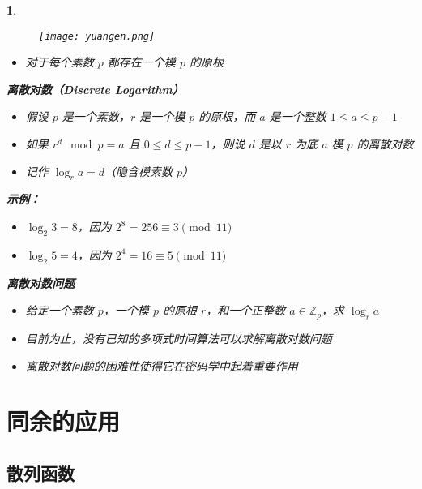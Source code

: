 \documentclass[UTF8]{report}
\theoremstyle{MyLineTheoremStyle} %
\theoremstyle{MyBlockTheoremStyle} %
\theoremstyle{MySubsubsectionStyle} %
\newtheorem{definition}{}
\begin{document}
\begin{definition}
    \begin{figure}[ht]
        \centering
        \texttt{[image: yuangen.png]}
    \end{figure}

    \begin{itemize}
        \item 对于每个素数 $p$ 都存在一个模 $p$ 的原根
    \end{itemize}

    \textbf{离散对数（Discrete Logarithm）}
    \begin{itemize}
        \item 假设 $p$ 是一个素数，$r$ 是一个模 $p$ 的原根，而 $a$ 是一个整数 $1 \leq a \leq p - 1$
        \item 如果 $r^d \mod{p} = a $ 且 $0 \leq d \leq p - 1$，则说 $d$ 是以 $r$ 为底 $a$ 模 $p$ 的离散对数
        \item 记作 $\log_r a = d$（隐含模素数 $p$）
    \end{itemize}

    \textbf{示例：}
    \begin{itemize}
        \item $\log_2 3 = 8$，因为 $2^8 = 256 \equiv 3 \pmod{11}$
        \item $\log_2 5 = 4$，因为 $2^4 = 16 \equiv 5 \pmod{11}$
    \end{itemize}

    \textbf{离散对数问题}
    \begin{itemize}
        \item 给定一个素数 $p$，一个模 $p$ 的原根 $r$，和一个正整数 $a \in \mathbb{Z}_p$，求 $\log_r a$
        \item 目前为止，没有已知的多项式时间算法可以求解离散对数问题
        \item 离散对数问题的困难性使得它在密码学中起着重要作用
    \end{itemize}
\end{definition}



\section{同余的应用}

\subsection{散列函数}
\end{document}
